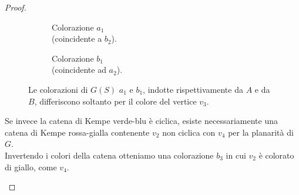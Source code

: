 \documentclass[a4paper,12pt,titlepage]{report}
\begin{document}
\begin{proof}
\begin{itemize}
\begin{figure}[H]
\begin{subfigure}{0.3\textwidth}
    				\caption{\centering Colorazione $a_1$ 
    					\\ (coincidente a $b_2$).}
    			\end{subfigure}
    			\begin{subfigure}{0.3\textwidth}
    				\centering
    				\caption{\centering Colorazione $b_1$ 
    					\\(coincidente ad $a_2$).}
    			\end{subfigure}
    			\vspace{0.5cm}
    			\caption{Le colorazioni di $G(S)$ $a_1$ e $b_1$, indotte rispettivamente da $A$ e da $B$, differiscono soltanto per il colore del vertice $v_3$.}
    		\end{figure}
    		Se invece la catena di Kempe verde-blu è ciclica, esiste necessariamente una catena di Kempe rossa-gialla contenente $v_2$ non ciclica con $v_4$ per la planarità di $G$.
    		\\Invertendo i colori della catena otteniamo una colorazione $b_3$ in cui $v_2$ è colorato di giallo, come $v_4$.
    		\begin{figure}[H]
    			\centering
\end{figure}
\end{itemize}
\end{proof}
\end{document}
